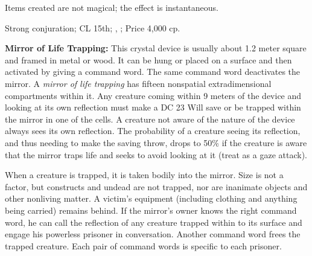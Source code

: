 Items created are not magical; the effect is instantaneous.

Strong conjuration; CL 15th; , ; Price 4,000 cp.











\textbf{Mirror of Life Trapping:} This crystal device is usually about 1.2 meter square and framed in metal or wood. It can be hung or placed on a surface and then activated by giving a command word. The same command word deactivates the mirror. A \emph{mirror of life trapping} has fifteen nonspatial extradimensional compartments within it. Any creature coming within 9 meters of the device and looking at its own reflection must make a DC 23 Will save or be trapped within the mirror in one of the cells. A creature not aware of the nature of the device always sees its own reflection. The probability of a creature seeing its reflection, and thus needing to make the saving throw, drops to 50\% if the creature is aware that the mirror traps life and seeks to avoid looking at it (treat as a gaze attack).

When a creature is trapped, it is taken bodily into the mirror. Size is not a factor, but constructs and undead are not trapped, nor are inanimate objects and other nonliving matter. A victim's equipment (including clothing and anything being carried) remains behind. If the mirror's owner knows the right command word, he can call the reflection of any creature trapped within to its surface and engage his powerless prisoner in conversation. Another command word frees the trapped creature. Each pair of command words is specific to each prisoner.

